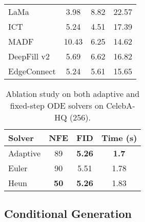 \documentclass{article}
\theoremstyle{plain}
\theoremstyle{definition}
\theoremstyle{remark}
\begin{document}
\begin{table}[t]
{{\begin{tabu}{l c c c}
        LaMa \cite{suvorov2022resolution} &3.98  &8.82 &22.57\\
        ICT  \cite{wan2021high} &5.24 &4.51 &17.39\\
        MADF \cite{zhu2021image} &10.43 &6.25 &14.62\\
        DeepFill v2 \cite{yu2019free} &5.69  &6.62 &16.82\\
        EdgeConnect \cite{nazeri2019edgeconnect} &5.24  &5.61 &15.65\\
        \bottomrule
\end{tabu}
    }
    \label{tab:inpainting}
    }
\label{fig:conditional}
\vspace{-5mm}
\end{table}







\begin{table}[t]
  \centering
  \caption{Ablation study on both adaptive and fixed-step ODE solvers on CelebA-HQ (256).}
  \vspace{1mm}
  \begin{tabular}{l c c c}
    \toprule
    Solver & NFE  & FID & Time (s) \\
    \midrule
    Adaptive & 89 & \textbf{5.26} & \textbf{1.7} \\
    \midrule
    Euler & 90 & 5.51 & 1.78 \\
    Heun & \textbf{50} &\textbf{5.26} & 1.83 \\
    \bottomrule
  \end{tabular}
  \label{tab:solver}
\vspace{-4mm}
\end{table}

\subsection{Conditional Generation}
\end{document}
